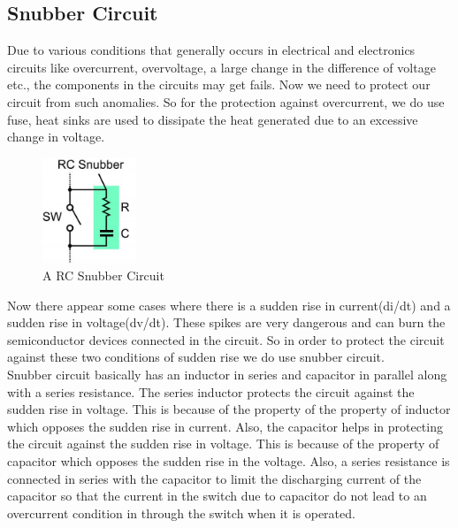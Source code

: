 \subsection{Snubber Circuit}
Due to various conditions that generally occurs in electrical and electronics circuits like overcurrent, overvoltage, a large change in the difference of voltage etc., the components in the circuits may get fails. Now we need to protect our circuit from such anomalies. So for the protection against overcurrent, we do use fuse, heat sinks are used to dissipate the heat generated due to an excessive change in voltage.\\
\begin{figure}
	\includegraphics[width=0.25\textwidth]{photos/theory/snubber.jpg}
	\caption{A RC Snubber Circuit}
\end{figure}

Now there appear some cases where there is a sudden rise in current(di/dt) and a sudden rise in voltage(dv/dt). These spikes are very dangerous and can burn the semiconductor devices connected in the circuit. So in order to protect the circuit against these two conditions of sudden rise we do use snubber circuit. \\
Snubber circuit basically has an inductor in series and capacitor in parallel along with a series resistance. The series inductor protects the circuit against the sudden rise in voltage. This is because of the property of the property of inductor which opposes the sudden rise in current. Also, the capacitor helps in protecting the circuit against the sudden rise in voltage. This is because of the property of capacitor which opposes the sudden rise in the voltage. Also, a series resistance is connected in series with the capacitor to limit the discharging current of the capacitor so that the current in the switch due to capacitor do not lead to an overcurrent condition in through the switch when it is operated. \\

